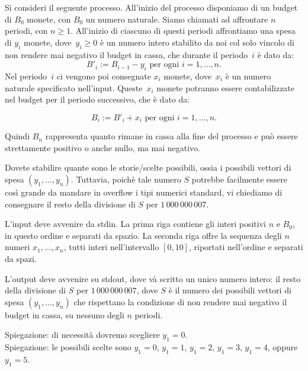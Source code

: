 \renewcommand{\nomebreve}{online\_budget}
\renewcommand{\titolo}{Histories of a budget mantained non-negative online}

\introduzione{}

Si consideri il seguente processo.
All'inizio del processo disponiamo di un budget di $B_0$ monete, con $B_0$ un numero naturale.
Siamo chiamati ad affrontare $n$ periodi, con $n \geq 1$.
All'inizio di ciascuno di questi periodi affrontiamo una spesa di $y_i$ monete, dove~$y_i\geq 0$ è un numero intero stabilito da noi col solo vincolo di non rendere mai negativo
il budget in cassa, che durante il periodo~$i$ è dato da:
\[
   B'_{i} := B_{i-1}  - y_{i} \mbox{ per ogni $i=1,\ldots, n$.}
\]  
Nel periodo~$i$ ci vengono poi consegnate $x_i$ monete, dove~$x_i$ è un numero naturale specificato nell'input. Queste~$x_i$ monete potranno essere contabilizzate nel budget per il periodo successivo, che è dato da:

\[
   B_{i} := B'_{i} + x_{i} \mbox{ per ogni $i=1,\ldots, n$.}
\]

Quindi $B_n$ rappresenta quanto rimane in cassa alla fine del processo e può essere strettamente positivo o anche nullo, ma mai negativo.

Dovete stabilire quante sono le storie/scelte possibili, ossia i possibili vettori di spesa  $(y_1, \ldots, y_n)$. Tuttavia, poichè tale numero $S$ potrebbe facilmente essere così grande da mandare in overflow i tipi numerici standard, vi chiediamo di consegnare il resto della divisione di $S$ per $1\,000\,000\,007$.


L'input deve avvenire da stdin.
La prima riga contiene gli interi positivi $n$ e $B_0$, in questo ordine e separati da spazio.
La seconda riga offre la sequenza degli $n$ numeri $x_1, \ldots, x_n$, tutti interi nell'intervallo $[0, 10]$, riportati nell'ordine e separati da spazi.

L'output deve avvenire su stdout, dove và scritto un unico numero intero:
il resto della divisione di $S$ per $1\,000\,000\,007$,
dove $S$ è il numero dei possibili vettori di spesa $(y_1, \ldots, y_n)$
che rispettano la condizione di non rendere mai negativo il budget in cassa, su nessuno degli $n$ periodi.


Spiegazione: di necessità dovremo scegliere $y_1 = 0$.\\

Spiegazione: le possibili scelte sono $y_1 = 0$, $y_1 = 1$, $y_1 = 2$, $y_1 = 3$, $y_1 = 4$, oppure $y_1 = 5$.\\

